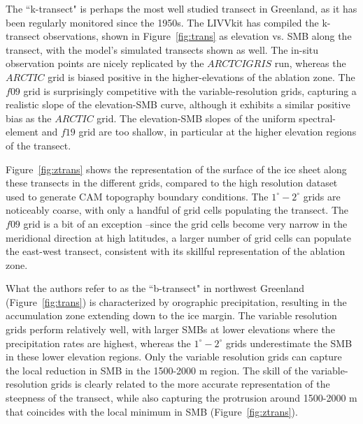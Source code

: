 \documentclass[draft]{agujournal2019}
\begin{document}

The ``k-transect" is perhaps the most well studied transect in Greenland, as it has been regularly monitored since the 1950s. The LIVVkit has compiled the k-transect observations, shown in Figure~\ref{fig:trans} as elevation vs. SMB along the transect, with the model's simulated transects shown as well. The in-situ observation points are nicely replicated by the $ARCTCIGRIS$ run, whereas the $ARCTIC$ grid is biased positive in the higher-elevations of the ablation zone. The $f09$ grid is surprisingly competitive with the variable-resolution grids, capturing a realistic slope of the elevation-SMB curve, although it exhibits a similar positive bias as the $ARCTIC$ grid. The elevation-SMB slopes of the uniform spectral-element and $f19$ grid are too shallow, in particular at the higher elevation regions of the transect. 

Figure~\ref{fig:ztrans} shows the representation of the surface of the ice sheet along these transects in the different grids, compared to the high resolution dataset used to generate CAM topography boundary conditions. The $1^{\circ}-2^{\circ}$ grids are noticeably coarse, with only a handful of grid cells populating the transect. The $f09$ grid is a bit of an exception --since the grid cells become very narrow in the meridional direction at high latitudes, a larger number of grid cells can populate the east-west transect, consistent with its skillful representation of the ablation zone.

What the authors refer to as the ``b-transect" in northwest Greenland (Figure~\ref{fig:trans}) is characterized by orographic precipitation, resulting in the accumulation zone extending down to the ice margin. The variable resolution grids perform relatively well, with larger SMBs at lower elevations where the precipitation rates are highest, whereas the $1^{\circ}-2^{\circ}$ grids underestimate the SMB in these lower elevation regions. Only the variable resolution grids can capture the local reduction in SMB in the 1500-2000 m region. The skill of the variable-resolution grids is clearly related to the more accurate representation of the steepness of the transect, while also capturing the protrusion around 1500-2000 m that coincides with the local minimum in SMB (Figure~\ref{fig:ztrans}).
\end{document}
